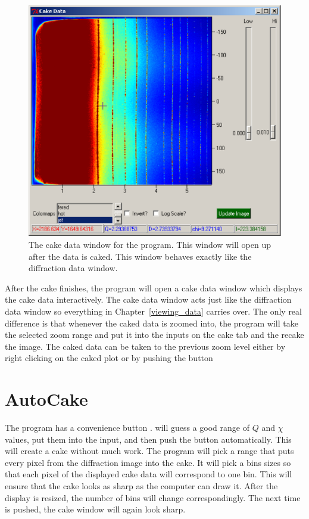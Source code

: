 \begin{figure}
    \centering
    \includegraphics[scale=.75]{figures/cake_data_window.eps}
    \caption{The cake data window for
    the program. This window will open up after the
    data is caked. This window behaves exactly like 
    the diffraction data window.} 
    \label{cake_data_window}
\end{figure}

After the cake finishes, the program will open a cake data
window which displays the cake data interactively.
The cake data window acts just like the diffraction
data window so everything in Chapter~\ref{viewing_data} 
carries over. The only real difference is that whenever
the caked data is zoomed into, the program will take
the selected zoom range and put it into the inputs on
the cake tab and the recake the image. The caked data can 
be taken to the previous zoom level
either by right clicking on the caked plot or by
pushing the  button 

\section{AutoCake}

The program has a convenience button .
 will guess a good range of $Q$ and $\chi$ 
values, put them into the input, and then push the 
 button automatically. This will create a 
cake without much work. The program will pick a range
that puts every pixel from the 
diffraction image into the cake. It will pick
a bins sizes so that each pixel of the displayed 
cake data will correspond to one bin. This will ensure
that the cake looks as sharp as the computer can draw it.
After the display is resized, the number of bins will
change correspondingly. The next time  is 
pushed, the cake window will again look sharp.

